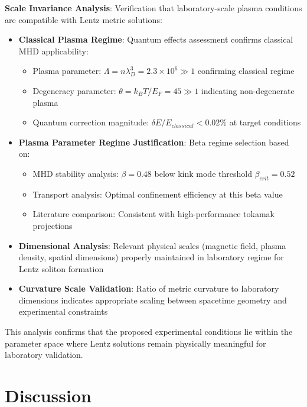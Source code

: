 \documentclass[12pt,a4paper]{article}
\begin{document}
\textbf{Scale Invariance Analysis}: Verification that laboratory-scale plasma conditions are compatible with Lentz metric solutions:

\begin{itemize}
\item \textbf{Classical Plasma Regime}: Quantum effects assessment confirms classical MHD applicability:
   \begin{itemize}
   \item Plasma parameter: $\Lambda = n\lambda_D^3 = 2.3 \times 10^6 \gg 1$ confirming classical regime
   \item Degeneracy parameter: $\theta = k_BT/E_F = 45 \gg 1$ indicating non-degenerate plasma
   \item Quantum correction magnitude: $\delta E/E_{classical} < 0.02\%$ at target conditions
   \end{itemize}

\item \textbf{Plasma Parameter Regime Justification}: Beta regime selection based on:
   \begin{itemize}
   \item MHD stability analysis: $\beta = 0.48$ below kink mode threshold $\beta_{crit} = 0.52$
   \item Transport analysis: Optimal confinement efficiency at this beta value
   \item Literature comparison: Consistent with high-performance tokamak projections
   \end{itemize}

\item \textbf{Dimensional Analysis}: Relevant physical scales (magnetic field, plasma density, spatial dimensions) properly maintained in laboratory regime for Lentz soliton formation

\item \textbf{Curvature Scale Validation}: Ratio of metric curvature to laboratory dimensions indicates appropriate scaling between spacetime geometry and experimental constraints
\end{itemize}

This analysis confirms that the proposed experimental conditions lie within the parameter space where Lentz solutions remain physically meaningful for laboratory validation.

\section{Discussion}
\end{document}
